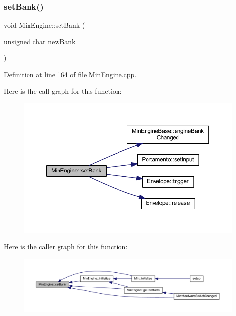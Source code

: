 \subsubsection{\texorpdfstring{set\+Bank()}{setBank()}}
{\footnotesize\ttfamily void Min\+Engine\+::set\+Bank (\begin{DoxyParamCaption}\item[{unsigned char}]{new\+Bank }\end{DoxyParamCaption})}



Definition at line 164 of file Min\+Engine.\+cpp.

Here is the call graph for this function\+:
\nopagebreak
\begin{figure}[H]
\begin{center}
\leavevmode
\includegraphics[width=350pt]{class_min_engine_ac76abe71fbd84b163b68fc7b12fb1a26_cgraph}
\end{center}
\end{figure}
Here is the caller graph for this function\+:
\nopagebreak
\begin{figure}[H]
\begin{center}
\leavevmode
\includegraphics[width=350pt]{class_min_engine_ac76abe71fbd84b163b68fc7b12fb1a26_icgraph}
\end{center}
\end{figure}
\mbox{\label{class_min_engine_a33949965a982b0d8e690ebc781e33977}} 
